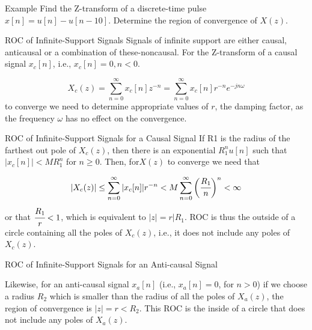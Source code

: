 \documentclass[aspectratio=169,xcolor=dvipsnames,svgnames,x11names,fleqn]{beamer}
\begin{document}
\begin{frame}{Example}
    Find the Z-transform of a discrete-time pulse $x[n] = u[n] - u[n - 10]$. Determine the region of convergence of $X(z)$.

\end{frame}

\begin{frame}{}
\vspace*{-9\baselineskip}
    \color{LightGray}{Blank space for calculation}
\end{frame}
\begin{frame}{}
\vspace*{-9\baselineskip}
    \color{LightGray}{Blank space for calculation}
\end{frame}
\begin{frame}{}
\vspace*{-9\baselineskip}
    \color{LightGray}{Blank space for calculation}
\end{frame}

\begin{frame}{ROC of Infinite-Support Signals}
    Signals of infinite support are either causal, anticausal or a combination of these-noncausal. For the Z-transform of a causal signal $x_c[n]$, i.e., $x_c[n] = 0, n < 0$.

$$
X_c(z) = \sum_{n= 0}^\infty x_c[n]z^{-n} = \sum_{n= 0}^\infty x_c[n] r^{-n}e^{-jn \omega}
$$
to converge we need to determine appropriate values of $r$, the damping factor, as the frequency $\omega$ has no effect on the convergence.

    
\end{frame}

\begin{frame}{ROC of Infinite-Support Signals for a Causal Signal}
    If R1 is the radius of the farthest out pole of $X_c(z)$, then there is an exponential $R^n_1 u[n]$ such that $|x_c[n]| < M R_1^n$ for $n\geq 0$. Then, for$ X(z)$ to converge we need that

    $$
    |X_c(z) | \leq \sum_{n=0}^\infty |x_c[n] | r^{-n} < M \sum_{n=0}^\infty \bigg(\cfrac{R_1}{n} \bigg)^n < \infty
    $$
    or that $\cfrac{R_1}{r}< 1$, which is equivalent to $|z| = r | R_1$.  ROC is thus the outside of a circle containing all the poles of $X_c(z)$, i.e., it does not include any poles of $X_c(z)$.
\end{frame}

\begin{frame}{ROC of Infinite-Support Signals for an Anti-causal Signal}
    \Large
    
    Likewise, for an anti-causal signal $x_a[n]$ (i.e., $x_a[n] = 0$, for $n > 0$) if we choose a radius $R_2$ which is smaller than the radius of all the poles of $X_a(z)$, the region of convergence is $|z| = r<R_2$. This ROC is the inside of a circle that does not include any poles of $X_a(z)$.
\end{frame}
\end{document}
